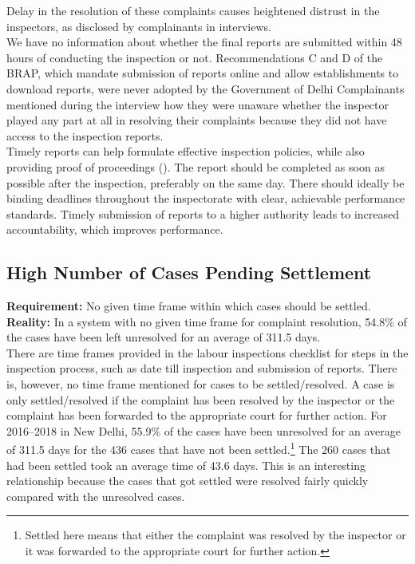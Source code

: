 \documentclass[a4paper, 12pt, twoside]{article}
\begin{document}
Delay in the resolution of these complaints causes heightened distrust in the inspectors, as disclosed by complainants in interviews. \\

We have no information about whether the final reports are submitted within 48 hours of conducting the inspection or not. Recommendations C and D of the BRAP, which mandate submission of reports online and allow establishments to download reports, were never adopted by the Government of Delhi Complainants mentioned during the interview how they were unaware whether the inspector played any part at all in resolving their complaints because they did not have access to the inspection reports. \\

Timely reports can help formulate effective inspection policies, while also providing proof of proceedings (\cite{iloreportamerica}). The report should be completed as soon as possible after the inspection, preferably on the same day. There should ideally be binding deadlines throughout the inspectorate with clear, achievable performance standards. Timely submission of reports to a higher authority leads to increased accountability, which improves performance.

\subsection{High Number of Cases Pending Settlement}

\textbf{Requirement:} No given time frame within which cases should be settled.\\

\textbf{Reality:} In a system with no given time frame for complaint resolution, 54.8\% of the cases have been left unresolved for an average of 311.5 days.\\

There are time frames provided in the labour inspections checklist for steps in the inspection process, such as date till inspection and submission of reports. There is, however, no time frame mentioned for cases to be settled/resolved. A case is only settled/resolved if the complaint has been resolved by the inspector or the complaint has been forwarded to the appropriate court for further action. For 2016–2018 in New Delhi, 55.9\% of the cases have been unresolved for an average of 311.5 days for the 436 cases that have not been settled.\footnote{Settled here means that either the complaint was resolved by the inspector or it was forwarded to the appropriate court for further action.} The 260 cases that had been settled took an average time of 43.6 days. This is an interesting relationship because the cases that got settled were resolved fairly quickly compared with the unresolved cases.\\
\end{document}
